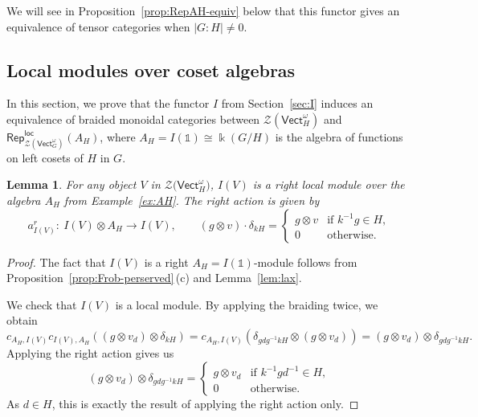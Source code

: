 \documentclass[10pt,a4paper]{amsart}
\numberwithin{equation}{section}
\newtheorem{Lemma}[Theorem]{Lemma}
\newcommand{\one}{\mathds{1}}
\newcommand{\locmod}{\mathsf{Rep}^{\mathsf{loc}}}
\newcommand{\Vect}{\mathsf{Vect}}
\newcommand{\cZ}{\mathcal{Z}}
\newcommand{\rI}{I}
\begin{document}
We will see in Proposition~\ref{prop:RepAH-equiv} below that this functor gives an equivalence of tensor categories when $|G:H|\neq 0$.

\subsection{Local modules over coset algebras}

In this section, we prove that the functor $\rI$ from Section~\ref{sec:I} induces an equivalence of braided monoidal categories between
$\cZ( \Vect_H^\omega)$ and $\locmod_{\cZ( \Vect_G^\omega)}(A_H)$, where
$A_H=\rI(\one)\cong \Bbbk(G/H)$ is the algebra of functions on left cosets of $H$ in $G$.

\begin{Lemma}\label{lem:AH-action}
For any object $V$ in $\cZ\big(\Vect_H^\omega\big)$, $\rI(V)$ is a right local module over the algebra $A_H$ from Example~{\rm \ref{ex:AH}}. The right action is given by
\[
a_{\rI(V)}^r\colon\ \rI(V)\otimes A_H\to \rI(V), \qquad (g\otimes v)\cdot \delta_{kH}=
\begin{cases}
g\otimes v & \text{if $k^{-1}g\in H$,}\\
0 & \text{otherwise.}
\end{cases}
\]
\end{Lemma}
\begin{proof}
The fact that $\rI(V)$ is a right $A_H=\rI(\one)$-module follows from Proposition~\ref{prop:Frob-perserved}\,(c) and Lemma~\ref{lem:lax}.

We check that $\rI(V)$ is a local module. By applying the braiding twice, we obtain
\[
c_{A_H,\rI(V)}c_{\rI(V),A_H}((g\otimes v_d)\otimes \delta_{kH}) = c_{A_H,\rI(V)}(\delta_{gdg^{-1}kH} \otimes (g\otimes v_d)) = (g\otimes v_d) \otimes \delta_{gdg^{-1}kH}.
\]
Applying the right action gives us
\[
(g\otimes v_d) \otimes \delta_{gdg^{-1}kH}=
\begin{cases}
g\otimes v_d & \text{if $k^{-1}gd^{-1}\in H$,}\\
0 & \text{otherwise.}
\end{cases}
\]
As $d\in H$, this is exactly the result of applying the right action only.
\end{proof}
\end{document}
